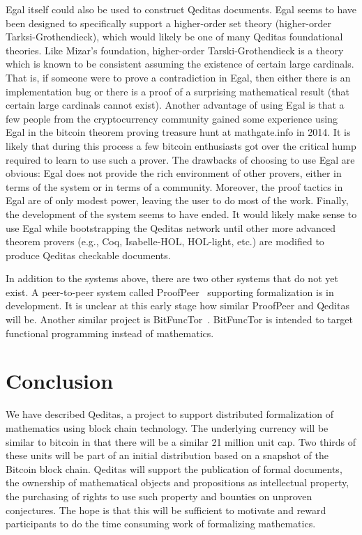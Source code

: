 \documentclass{article}
\begin{document}
Egal itself could also be used to construct Qeditas documents.
Egal seems to have been designed to specifically support a
higher-order set theory (higher-order Tarksi-Grothendieck),
which would likely be one of many Qeditas foundational theories.
Like Mizar's foundation, higher-order Tarski-Grothendieck is a
theory which is known to be consistent assuming the existence of certain large
cardinals. That is, if someone were to prove a contradiction in Egal, then either
there is an implementation bug or there is a proof of a surprising mathematical
result (that certain large cardinals cannot exist).
Another advantage of using Egal is that a few people from the cryptocurrency community
gained some experience using Egal in the bitcoin theorem proving treasure hunt
at mathgate.info in 2014. It is likely that during this process a few bitcoin
enthusiasts got over the critical hump required to learn to use such a prover.
The drawbacks of choosing to use Egal are obvious: Egal does not provide
the rich environment of other provers, either in terms of the system or in terms
of a community. Moreover, the proof tactics in Egal are of only modest power,
leaving the user to do most of the work. Finally, the development of the system
seems to have ended.
It would likely make sense to use Egal while bootstrapping the Qeditas network
until other more advanced theorem provers (e.g., Coq, Isabelle-HOL, HOL-light, etc.)
are modified to produce Qeditas checkable documents.

In addition to the systems above, there are two other systems that do not yet
exist. A peer-to-peer system called ProofPeer~\cite{ProofPeer} supporting formalization is in
development. It is unclear at this early stage how similar ProofPeer and Qeditas
will be. Another similar project is BitFuncTor~\cite{bitFuncTor}. BitFuncTor is intended to
target functional programming instead of mathematics.

\section{Conclusion}\label{sec:concl}

We have described Qeditas, a project to support distributed formalization of
mathematics using block chain technology. The underlying currency will be
similar to bitcoin in that there will be a similar 21 million unit cap. Two thirds
of these units will be part of an initial distribution based on a snapshot of the
Bitcoin block chain. Qeditas will support the publication of formal documents,
the ownership of mathematical objects and propositions as intellectual property, the purchasing of rights to use such property and bounties on unproven
conjectures. The hope is that this will be sufficient to motivate and reward
participants to do the time consuming work of formalizing mathematics.




\end{document}
